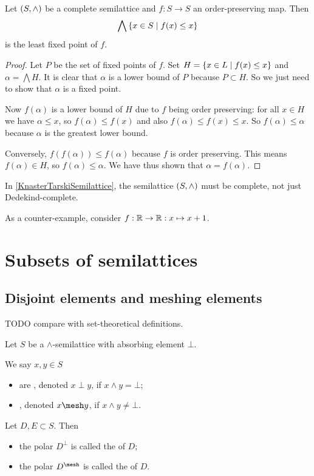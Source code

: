 \begin{theorem} \label{KnasterTarskiSemilattice}
Let $\sSet{S,\wedge}$ be a complete semilattice and $f:S\to S$ an order-preserving map. Then 
\[ \bigwedge \setbuilder{x\in S}{f(x) \leq x} \]
is the least fixed point of $f$.
\end{theorem}
\begin{proof}
Let $P$ be the set of fixed points of $f$. Set $H = \setbuilder{x\in L}{f(x)\leq x}$ and $\alpha = \bigwedge H$. It is clear that $\alpha$ is a lower bound of $P$ because $P \subset H$. So we just need to show that $\alpha$ is a fixed point.

Now $f(\alpha)$ is a lower bound of $H$ due to $f$ being order preserving: for all $x\in H$ we have $\alpha\leq x$, so $f(\alpha) \leq f(x)$ and also $f(\alpha) \leq f(x) \leq x$. So $f(\alpha)\leq \alpha$ because $\alpha$ is the greatest lower bound.

Conversely, $f(f(\alpha)) \leq f(\alpha)$ because $f$ is order preserving. This means $f(\alpha)\in H$, so $f(\alpha)\leq \alpha$. We have thus shown that $\alpha = f(\alpha)$.
\end{proof}

\begin{example}
In \ref{KnasterTarskiSemilattice}, the semilattice $\sSet{S,\wedge}$ must be complete, not just Dedekind-complete.

As a counter-example, consider $f: \mathbb{R}\to\mathbb{R}: x\mapsto x+1$.
\end{example}

\section{Subsets of semilattices}
\subsection{Disjoint elements and meshing elements}
TODO compare with set-theoretical definitions.
\begin{definition}
Let $S$ be a $\wedge$-semilattice with absorbing element $\bot$.

We say $x,y\in S$
\begin{itemize}
\item are , denoted $x \perp y$, if $x\wedge y = \bot$;
\item {}, denoted $x\mesh y$, if $x\wedge y \neq \bot$.
\end{itemize}

Let $D, E \subset S$. Then
\begin{itemize}
\item the polar $D^\perp$ is called the  of $D$;
\item the polar $D^{\mesh}$ is called the  of $D$.
\end{itemize}
\end{definition}

